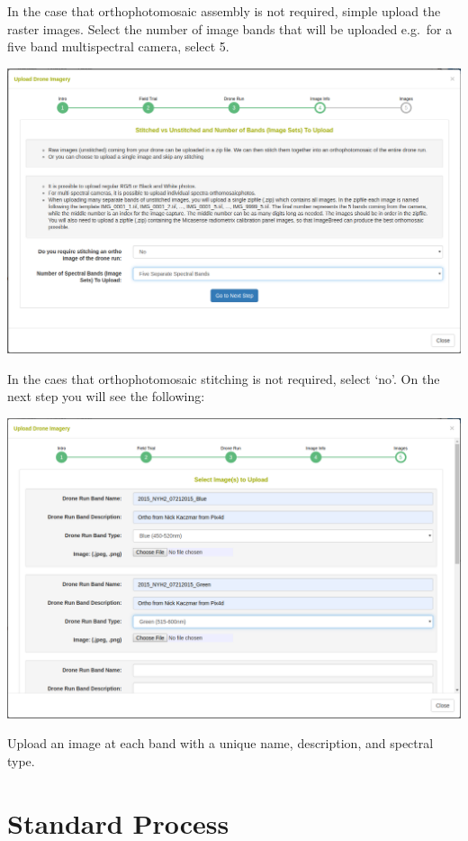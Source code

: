 \documentclass[
  12pt,
]{book}
\begin{document}
In the case that orthophotomosaic assembly is not required, simple upload the raster images. Select the number of image bands that will be uploaded e.g.~for a five band multispectral camera, select 5.

\begin{center}\includegraphics[width=0.95\linewidth]{assets/images/manage_image_phenotyping_upload_image_info_3} \end{center}

In the caes that orthophotomosaic stitching is not required, select `no'. On the next step you will see the following:

\begin{center}\includegraphics[width=0.95\linewidth]{assets/images/manage_image_phenotyping_upload_images_rasters} \end{center}

Upload an image at each band with a unique name, description, and spectral type.

\hypertarget{standard-process}{%
\section{Standard Process}\label{standard-process}}
\end{document}
